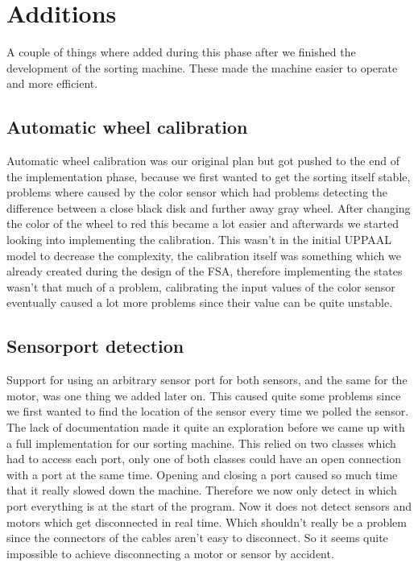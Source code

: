 
\section{Additions} \label{software-implementation:additions}
A couple of things where added during this phase after we finished the development of the sorting machine. These made the machine easier to operate and more efficient.

\subsection{Automatic wheel calibration}
Automatic wheel calibration was our original plan but got pushed to the end of the implementation phase, because we first wanted to get the sorting itself stable, problems where caused by the color sensor which had problems detecting the difference between a close black disk and further away gray wheel. After changing the color of the wheel to red this became a lot easier and afterwards we started looking into implementing the calibration. This wasn't in the initial UPPAAL model to decrease the complexity, the calibration itself was something which we already created during the design of the FSA, therefore implementing the states wasn't that much of a problem, calibrating the input values of the color sensor eventually caused a lot more problems since their value can be quite unstable.

\subsection{Sensorport detection}
Support for using an arbitrary sensor port for both sensors, and the same for the motor, was one thing we added later on. This caused quite some problems since we first wanted to find the location of the sensor every time we polled the sensor. The lack of documentation made it quite an exploration before we came up with a full implementation for our sorting machine. This relied on two classes which had to access each port, only one of both classes could have an open connection with a port at the same time. Opening and closing a port caused so much time that it really slowed down the machine. Therefore we now only detect in which port everything is at the start of the program. Now it does not detect sensors and motors which get disconnected in real time. Which shouldn't really be a problem since the connectors of the cables aren't easy to disconnect. So it seems quite impossible to achieve disconnecting a motor or sensor by accident.

